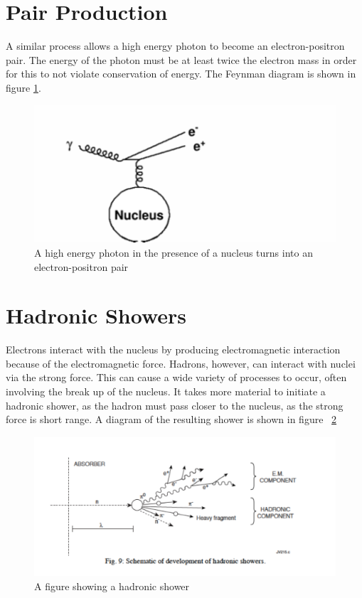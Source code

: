 \;

\section{Pair Production}

\noindent
A similar process allows a high energy photon to become an electron-positron pair.  The energy of the photon must be at least twice the electron mass in order for this to not violate conservation of energy.  The Feynman diagram is shown in figure \ref{fig:cal3}.


\;
\;

\begin{figure}[h]
\centering\includegraphics[scale=0.7]{./calorimetry/Pictures/fig3.pdf}
\caption{A high energy photon in the presence of a nucleus turns into an electron-positron pair}
\label{fig:cal3}
\end{figure}

\;

\section{Hadronic Showers}

\noindent
Electrons interact with the nucleus by producing electromagnetic interaction because of the electromagnetic force. Hadrons, however, can interact with nuclei via the strong force. This can cause a wide variety of processes to occur, often involving the break up of the nucleus. It takes more material to initiate a hadronic shower, as the hadron must pass closer to the nucleus, as the strong force is short range. A diagram of the resulting shower is shown in figure ~\ref{fig:cal4}

\;
\;

\begin{figure}[h]
\centering\includegraphics[scale=0.5]{./calorimetry/Pictures/fig4.pdf}
\caption{A figure showing a hadronic shower}
\label{fig:cal4}
\end{figure}

